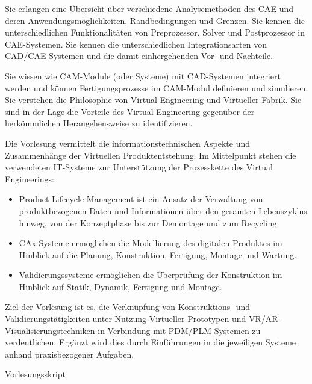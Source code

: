 \begin{course}
\begin{learningoutcomes}
 

Sie erlangen eine Übersicht über verschiedene Analysemethoden des CAE und deren Anwendungsmöglichkeiten, Randbedingungen und Grenzen. Sie kennen die unterschiedlichen Funktionalitäten von Preprozessor, Solver und Postprozessor in CAE-Systemen. Sie kennen die unterschiedlichen Integrationsarten von CAD/CAE-Systemen und die damit einhergehenden Vor- und Nachteile.

 

Sie wissen wie CAM-Module (oder Systeme) mit CAD-Systemen integriert werden und können Fertigungsprozesse im CAM-Modul definieren und simulieren. Sie verstehen die Philosophie von Virtual Engineering und Virtueller Fabrik. Sie sind in der Lage die Vorteile des Virtual Engineering gegenüber der herkömmlichen Herangehensweise zu identifizieren.


\end{learningoutcomes}

\begin{content}
Die Vorlesung vermittelt die informationstechnischen Aspekte und Zusammenhänge der Virtuellen Produktentstehung. Im Mittelpunkt stehen die verwendeten IT-Systeme zur Unterstützung der Prozesskette des Virtual Engineerings:

 \begin{itemize}\item Product Lifecycle Management ist ein Ansatz der Verwaltung von produktbezogenen Daten und Informationen über den gesamten Lebenszyklus hinweg, von der Konzeptphase bis zur Demontage und zum Recycling.  \item CAx-Systeme ermöglichen die Modellierung des digitalen Produktes im Hinblick auf die Planung, Konstruktion, Fertigung, Montage und Wartung.  \item Validierungssysteme ermöglichen die Überprüfung der Konstruktion im Hinblick auf Statik, Dynamik, Fertigung und Montage.  \end{itemize}

Ziel der Vorlesung ist es, die Verknüpfung von Konstruktions- und Validierungstätigkeiten unter Nutzung Virtueller Prototypen und VR/AR-Visualisierungstechniken in Verbindung mit PDM/PLM-Systemen zu verdeutlichen. Ergänzt wird dies durch Einführungen in die jeweiligen Systeme anhand praxisbezogener Aufgaben.


\end{content}

\begin{media}Vorlesungsskript

\end{media}





\end{course}